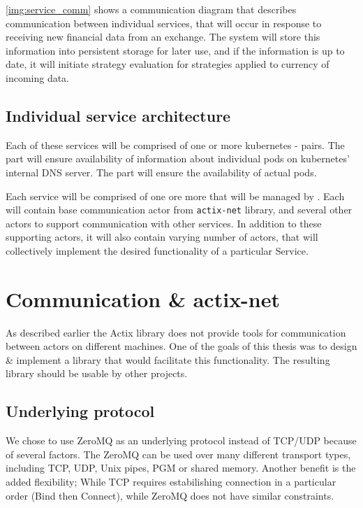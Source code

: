 \autoref{img:service_comm} shows a communication diagram that describes communication between individual services, that
will occur in response to receiving new financial data from an exchange. The system will store this information
into persistent storage for later use, and if the information is up to date, it will initiate strategy evaluation
for strategies applied to currency of incoming data.

\subsection{Individual service architecture}
Each of these services will be comprised of one or more kubernetes - pairs. The
 part will ensure availability of information about individual pods on kubernetes' internal DNS server.
The  part will ensure the availability of actual pods.

Each service will be comprised of one ore more  that will be managed by . Each 
will contain base communication actor from \verb|actix-net| library, and several other actors to support communication with other services. In addition to
these supporting actors, it will also contain varying number of actors, that will collectively implement
the desired functionality of a particular Service.

\section{Communication \& actix-net}
\label{section:actix_net}
As described earlier the Actix library does not provide tools for communication between actors on different machines. One of the
goals of this thesis was to design \& implement a library that would facilitate this functionality. The resulting library
should be usable by other projects.

\subsection{Underlying protocol}
We chose to use ZeroMQ\cite{hintjens2011} as an underlying protocol instead of TCP/UDP because of several factors. The ZeroMQ can be used over
many different transport types, including TCP, UDP, Unix pipes, PGM or shared memory. Another benefit is the added flexibility; While
TCP requires estabilishing connection in a particular order (Bind then Connect), while ZeroMQ does not have similar constraints.

